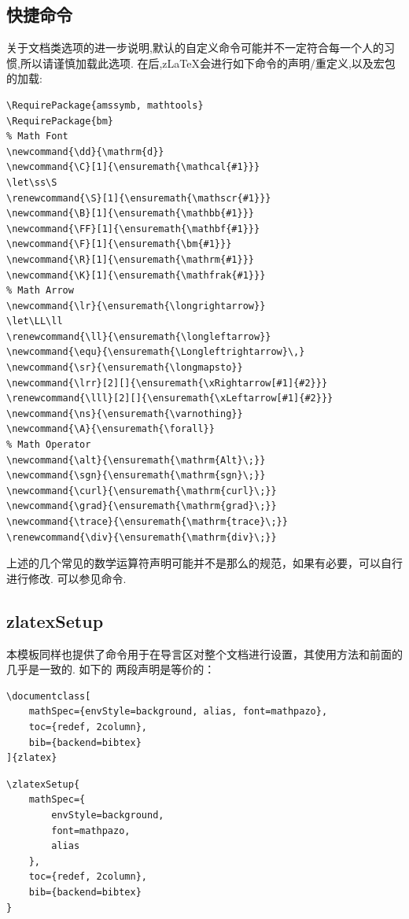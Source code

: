 \subsection{快捷命令}\label{快捷命令}
关于文档类选项的进一步说明,默认的自定义命令可能并不一定符合每一个人的习惯,所以请谨慎加载此选项.
在后,z\LaTeX{}会进行如下命令的声明/重定义,以及宏包的加载:
\begin{verbatim}
\RequirePackage{amssymb, mathtools}
\RequirePackage{bm}          
% Math Font 
\newcommand{\dd}{\mathrm{d}}
\newcommand{\C}[1]{\ensuremath{\mathcal{#1}}}
\let\ss\S
\renewcommand{\S}[1]{\ensuremath{\mathscr{#1}}}
\newcommand{\B}[1]{\ensuremath{\mathbb{#1}}}
\newcommand{\FF}[1]{\ensuremath{\mathbf{#1}}}
\newcommand{\F}[1]{\ensuremath{\bm{#1}}}
\newcommand{\R}[1]{\ensuremath{\mathrm{#1}}}
\newcommand{\K}[1]{\ensuremath{\mathfrak{#1}}}
% Math Arrow 
\newcommand{\lr}{\ensuremath{\longrightarrow}}
\let\LL\ll
\renewcommand{\ll}{\ensuremath{\longleftarrow}}
\newcommand{\equ}{\ensuremath{\Longleftrightarrow}\,}
\newcommand{\sr}{\ensuremath{\longmapsto}}
\newcommand{\lrr}[2][]{\ensuremath{\xRightarrow[#1]{#2}}}
\renewcommand{\lll}[2][]{\ensuremath{\xLeftarrow[#1]{#2}}}
\newcommand{\ns}{\ensuremath{\varnothing}}
\newcommand{\A}{\ensuremath{\forall}}
% Math Operator
\newcommand{\alt}{\ensuremath{\mathrm{Alt}\;}}
\newcommand{\sgn}{\ensuremath{\mathrm{sgn}\;}}
\newcommand{\curl}{\ensuremath{\mathrm{curl}\;}}
\newcommand{\grad}{\ensuremath{\mathrm{grad}\;}}
\newcommand{\trace}{\ensuremath{\mathrm{trace}\;}}
\renewcommand{\div}{\ensuremath{\mathrm{div}\;}}
\end{verbatim}

上述的几个常见的数学运算符声明可能并不是那么的规范，如果有必要，可以自行进行修改.
可以参见命令\cmd{\DeclareMathOperator}.

\subsection{zlatexSetup}
本模板同样也提供了命令\cmd{\zlatexSetup}用于在导言区对整个文档进行设置，其使用方法和前面的几乎是一致的. 如下的
两段声明是等价的：
\begin{verbatim}
\documentclass[
    mathSpec={envStyle=background, alias, font=mathpazo},
    toc={redef, 2column},
    bib={backend=bibtex}
]{zlatex}
\end{verbatim}

\begin{verbatim}
\zlatexSetup{
    mathSpec={
        envStyle=background,
        font=mathpazo, 
        alias
    },
    toc={redef, 2column},
    bib={backend=bibtex}
}
\end{verbatim}

